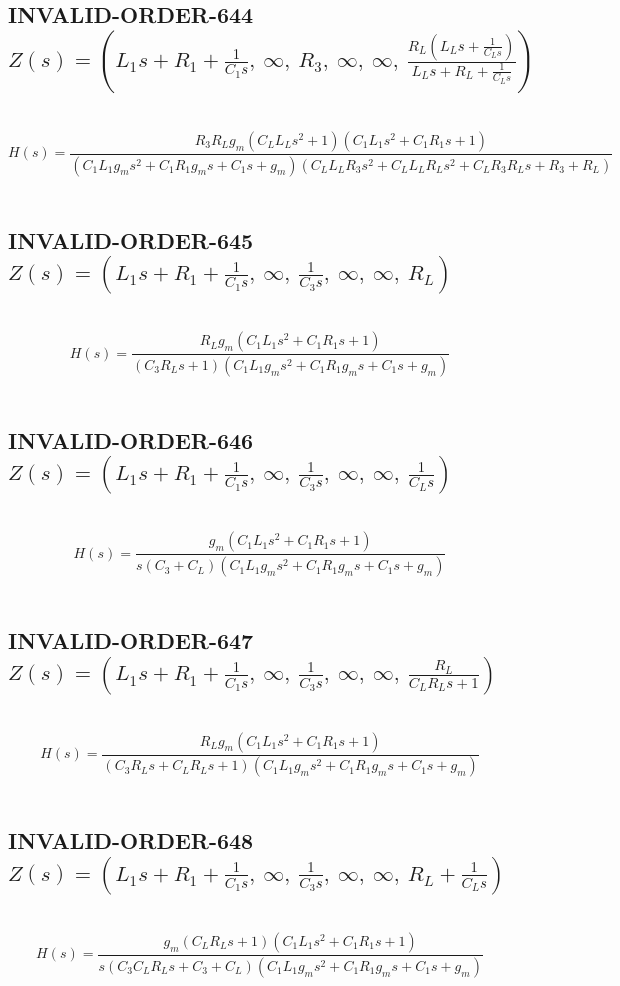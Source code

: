 \documentclass{article}
\begin{document}
\subsection{INVALID-ORDER-644 $Z(s) = \left( L_{1} s + R_{1} + \frac{1}{C_{1} s}, \  \infty, \  R_{3}, \  \infty, \  \infty, \  \frac{R_{L} \left(L_{L} s + \frac{1}{C_{L} s}\right)}{L_{L} s + R_{L} + \frac{1}{C_{L} s}}\right)$ } \ 
\textbf{\[H(s) = \frac{R_{3} R_{L} g_{m} \left(C_{L} L_{L} s^{2} + 1\right) \left(C_{1} L_{1} s^{2} + C_{1} R_{1} s + 1\right)}{\left(C_{1} L_{1} g_{m} s^{2} + C_{1} R_{1} g_{m} s + C_{1} s + g_{m}\right) \left(C_{L} L_{L} R_{3} s^{2} + C_{L} L_{L} R_{L} s^{2} + C_{L} R_{3} R_{L} s + R_{3} + R_{L}\right)}\] } \ 
\subsection{INVALID-ORDER-645 $Z(s) = \left( L_{1} s + R_{1} + \frac{1}{C_{1} s}, \  \infty, \  \frac{1}{C_{3} s}, \  \infty, \  \infty, \  R_{L}\right)$ } \ 
\textbf{\[H(s) = \frac{R_{L} g_{m} \left(C_{1} L_{1} s^{2} + C_{1} R_{1} s + 1\right)}{\left(C_{3} R_{L} s + 1\right) \left(C_{1} L_{1} g_{m} s^{2} + C_{1} R_{1} g_{m} s + C_{1} s + g_{m}\right)}\] } \ 
\subsection{INVALID-ORDER-646 $Z(s) = \left( L_{1} s + R_{1} + \frac{1}{C_{1} s}, \  \infty, \  \frac{1}{C_{3} s}, \  \infty, \  \infty, \  \frac{1}{C_{L} s}\right)$ } \ 
\textbf{\[H(s) = \frac{g_{m} \left(C_{1} L_{1} s^{2} + C_{1} R_{1} s + 1\right)}{s \left(C_{3} + C_{L}\right) \left(C_{1} L_{1} g_{m} s^{2} + C_{1} R_{1} g_{m} s + C_{1} s + g_{m}\right)}\] } \ 
\subsection{INVALID-ORDER-647 $Z(s) = \left( L_{1} s + R_{1} + \frac{1}{C_{1} s}, \  \infty, \  \frac{1}{C_{3} s}, \  \infty, \  \infty, \  \frac{R_{L}}{C_{L} R_{L} s + 1}\right)$ } \ 
\textbf{\[H(s) = \frac{R_{L} g_{m} \left(C_{1} L_{1} s^{2} + C_{1} R_{1} s + 1\right)}{\left(C_{3} R_{L} s + C_{L} R_{L} s + 1\right) \left(C_{1} L_{1} g_{m} s^{2} + C_{1} R_{1} g_{m} s + C_{1} s + g_{m}\right)}\] } \ 
\subsection{INVALID-ORDER-648 $Z(s) = \left( L_{1} s + R_{1} + \frac{1}{C_{1} s}, \  \infty, \  \frac{1}{C_{3} s}, \  \infty, \  \infty, \  R_{L} + \frac{1}{C_{L} s}\right)$ } \ 
\textbf{\[H(s) = \frac{g_{m} \left(C_{L} R_{L} s + 1\right) \left(C_{1} L_{1} s^{2} + C_{1} R_{1} s + 1\right)}{s \left(C_{3} C_{L} R_{L} s + C_{3} + C_{L}\right) \left(C_{1} L_{1} g_{m} s^{2} + C_{1} R_{1} g_{m} s + C_{1} s + g_{m}\right)}\] } \ 
\end{document}

